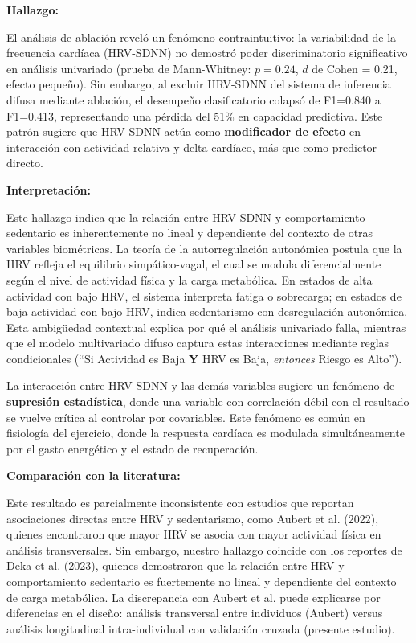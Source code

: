\textbf{Hallazgo:}

El análisis de ablación reveló un fenómeno contraintuitivo: la variabilidad de la frecuencia cardíaca (HRV-SDNN) no demostró poder discriminatorio significativo en análisis univariado (prueba de Mann-Whitney: $p=0.24$, $d$ de Cohen = 0.21, efecto pequeño). Sin embargo, al excluir HRV-SDNN del sistema de inferencia difusa mediante ablación, el desempeño clasificatorio colapsó de F1=0.840 a F1=0.413, representando una pérdida del 51\% en capacidad predictiva. Este patrón sugiere que HRV-SDNN actúa como \textbf{modificador de efecto} en interacción con actividad relativa y delta cardíaco, más que como predictor directo.

\textbf{Interpretación:}

Este hallazgo indica que la relación entre HRV-SDNN y comportamiento sedentario es inherentemente no lineal y dependiente del contexto de otras variables biométricas. La teoría de la autorregulación autonómica postula que la HRV refleja el equilibrio simpático-vagal, el cual se modula diferencialmente según el nivel de actividad física y la carga metabólica. En estados de alta actividad con bajo HRV, el sistema interpreta fatiga o sobrecarga; en estados de baja actividad con bajo HRV, indica sedentarismo con desregulación autonómica. Esta ambigüedad contextual explica por qué el análisis univariado falla, mientras que el modelo multivariado difuso captura estas interacciones mediante reglas condicionales (``Si Actividad es Baja \textbf{Y} HRV es Baja, \textit{entonces} Riesgo es Alto'').

La interacción entre HRV-SDNN y las demás variables sugiere un fenómeno de \textbf{supresión estadística}, donde una variable con correlación débil con el resultado se vuelve crítica al controlar por covariables. Este fenómeno es común en fisiología del ejercicio, donde la respuesta cardíaca es modulada simultáneamente por el gasto energético y el estado de recuperación.

\textbf{Comparación con la literatura:}

Este resultado es parcialmente inconsistente con estudios que reportan asociaciones directas entre HRV y sedentarismo, como Aubert et al. (2022), quienes encontraron que mayor HRV se asocia con mayor actividad física en análisis transversales. Sin embargo, nuestro hallazgo coincide con los reportes de Deka et al. (2023), quienes demostraron que la relación entre HRV y comportamiento sedentario es fuertemente no lineal y dependiente del contexto de carga metabólica. La discrepancia con Aubert et al. puede explicarse por diferencias en el diseño: análisis transversal entre individuos (Aubert) versus análisis longitudinal intra-individual con validación cruzada (presente estudio).

